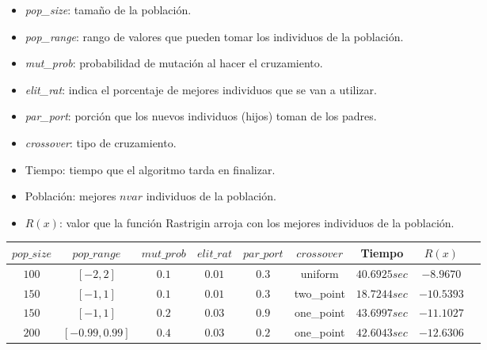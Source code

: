 \documentclass[a4paper, 12pt]{article}
\begin{document}
\begin{itemize}
    \item \emph{pop\_size}: tamaño de la población.
    \item \emph{pop\_range}: rango de valores que pueden tomar los individuos de la población.
    \item \emph{mut\_prob}: probabilidad de mutación al hacer el cruzamiento.
    \item \emph{elit\_rat}: indica el porcentaje de mejores individuos que se van a utilizar.
    \item \emph{par\_port}: porción que los nuevos individuos (hijos) toman de los padres.
    \item \emph{crossover}: tipo de cruzamiento.
    \item Tiempo: tiempo que el algoritmo tarda en finalizar.
    \item Población: mejores $nvar$ individuos de la población.
    \item $R(x)$: valor que la función Rastrigin arroja con los mejores individuos de la población.
\end{itemize}

\begin{table}[!ht]
    \begin{adjustbox}{width=\textwidth}
        \begin{tabular}{|c|c|c|c|c|c|c|c|c|}
            \rowcolor{yellow}
            \hline
            $pop\_size$ & $pop\_range$    & $mut\_prob$ & $elit\_rat$ & $par\_port$ & $crossover$ & Tiempo       & $R(x)$     \\
            \hline
            $100$       & $[-2, 2]$       & $0.1$       & $0.01$      & $0.3$       & uniform     & $40.6925sec$ & $-8.9670$  \\
            \hline
            $150$       & $[-1, 1]$       & $0.1$       & $0.01$      & $0.3$       & two\_point  & $18.7244sec$ & $-10.5393$ \\
            \hline
            $150$       & $[-1, 1]$       & $0.2$       & $0.03$      & $0.9$       & one\_point  & $43.6997sec$ & $-11.1027$ \\
            \hline
            $200$       & $[-0.99, 0.99]$ & $0.4$       & $0.03$      & $0.2$       & one\_point  & $42.6043sec$ & $-12.6306$ \\
            \hline
        \end{tabular}
    \end{adjustbox}
\end{table}
\end{document}
